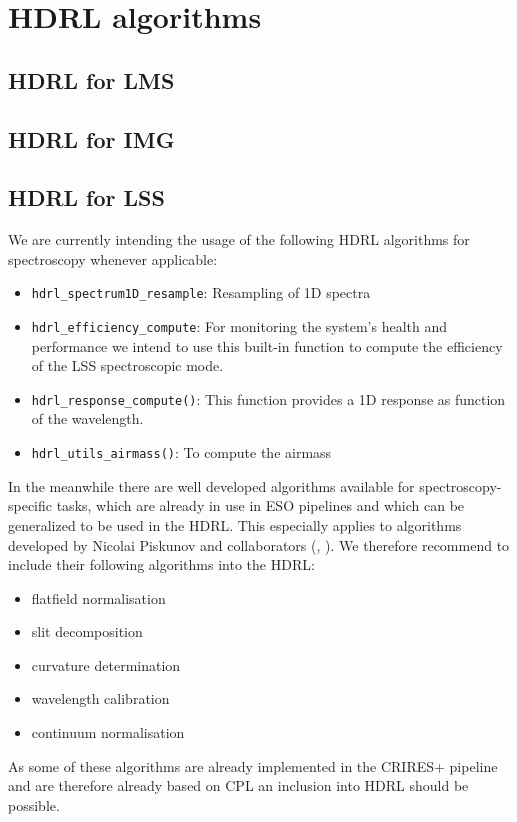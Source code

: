 \clearpage
\section{HDRL algorithms}\label{sec:hdrl_algorithms}
\subsection{HDRL for LMS}\label{ssec:hdrllms}


\subsection{HDRL for IMG}\label{ssec:hdrlimg}



\subsection{HDRL for LSS}\label{ssec:hdrllss}
We are currently intending the usage of the following \ac{HDRL} algorithms for spectroscopy whenever applicable:
\begin{itemize}
    \item \texttt{hdrl\_spectrum1D\_resample}: Resampling of 1D spectra
    \item \texttt{hdrl\_efficiency\_compute}: For monitoring the system's health and performance we intend to use this built-in function to compute the efficiency of the \ac{LSS} spectroscopic mode.
    \item \texttt{hdrl\_response\_compute()}: This function provides a 1D response as function of the wavelength. 
    \item \texttt{hdrl\_utils\_airmass()}: To compute the airmass
\end{itemize}

In the meanwhile there are well developed algorithms available for spectroscopy-specific tasks, which are already in use in ESO pipelines and which can be generalized to be used in the \ac{HDRL}. This especially applies to algorithms developed by Nicolai Piskunov and collaborators (\cite{pis21}, \cite{pis02}). We therefore recommend to include their following algorithms into the \ac{HDRL}:
\begin{itemize}
    \item flatfield normalisation
    \item slit decomposition
    \item curvature determination
    \item wavelength calibration
    \item continuum normalisation
\end{itemize}
As some of these algorithms are already implemented in the CRIRES+ pipeline and are therefore already based on \ac{CPL} an inclusion into \ac{HDRL} should be possible.
